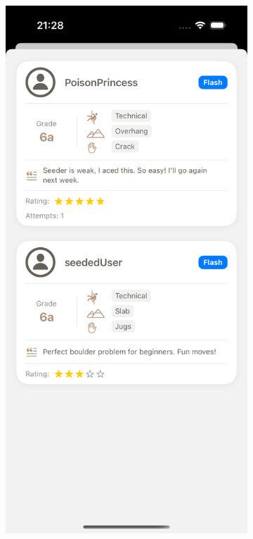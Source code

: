 \begin{figure}[H]
    \centering
    \begin{subfigure}[b]{0.38\textwidth}
        \centering
        \includegraphics[width=\textwidth]{images/implementacija/route-details/view-ascents.png}

\end{subfigure}
\end{figure}
